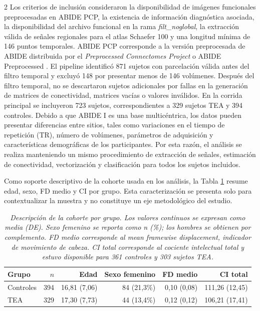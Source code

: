\documentclass[12pt,letterpaper]{article}
\begin{document}
\begin{multicols}{2}
Los criterios de inclusión consideraron la disponibilidad de imágenes
funcionales preprocesadas en ABIDE PCP, la existencia de información
diagnóstica asociada, la disponibilidad del archivo funcional en la rama
\textit{filt\_noglobal}, la extracción válida de señales regionales para el
atlas Schaefer 100 y una longitud mínima de 146 puntos temporales. ABIDE PCP
corresponde a la versión preprocesada de ABIDE distribuida por el
\textit{Preprocessed Connectomes Project} o ABIDE Preprocessed
\cite{craddock2013neurobureau}.
El pipeline identificó 871 sujetos con parcelación válida antes del filtro
temporal y excluyó 148 por presentar menos de 146 volúmenes. Después del filtro
temporal, no se descartaron sujetos adicionales por fallas en la generación de
matrices de conectividad, matrices vacías o valores inválidos.
En la corrida principal se incluyeron 723 sujetos, correspondientes a 329
sujetos TEA y 394 controles. Debido a que ABIDE I es una base multicéntrica, los datos
pueden presentar diferencias entre sitios, tales como variaciones en el
tiempo de repetición (TR), número de volúmenes, parámetros de
adquisición y características demográficas de los participantes. Por esta
razón, el análisis se realiza manteniendo un mismo procedimiento de
extracción de señales, estimación de conectividad, vectorización y
clasificación para todos los sujetos incluidos.

Como soporte descriptivo de la cohorte usada en los análisis, la Tabla
\ref{tab:descripcion_cohorte} resume edad, sexo, FD medio y CI por grupo. Esta
caracterización se presenta solo para contextualizar la muestra y no constituye
un eje metodológico del estudio.

\end{multicols}

\begin{table}[H]
\centering
\small
\begin{tabular}{lrrrrr}
\toprule
Grupo & $n$ & Edad & Sexo femenino & FD medio & CI total \\
\midrule
Controles & 394 & 16{,}81 (7{,}06) & 84 (21{,}3\%) & 0{,}10 (0{,}08) & 111{,}26 (12{,}45) \\
TEA & 329 & 17{,}30 (7{,}73) & 44 (13{,}4\%) & 0{,}12 (0{,}12) & 106{,}21 (17{,}41) \\
\bottomrule
\end{tabular}
\caption{\textit{Descripción de la cohorte por grupo. Los valores continuos se expresan como media (DE). Sexo femenino se reporta como n (\%); los hombres se obtienen por complemento. FD medio corresponde al \textit{mean framewise displacement}, indicador de movimiento de cabeza. CI total corresponde al cociente intelectual total y estuvo disponible para 361 controles y 303 sujetos TEA.}}
\label{tab:descripcion_cohorte}
\end{table}
\end{document}
